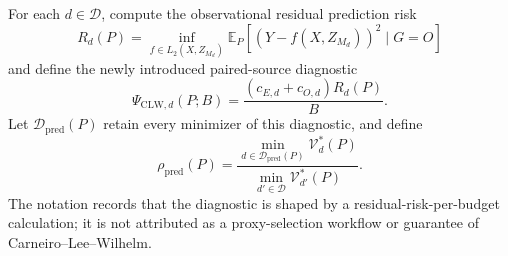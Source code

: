 For each \(d\in\mathcal D\), compute the observational residual prediction risk
\[
R_d(P)=\inf_{f\in L_2(X,Z_{M_d})}\mathbb E_P[(Y-f(X,Z_{M_d}))^2\mid G=O]
\]
and define the newly introduced paired-source diagnostic
\[
\Psi_{\mathrm{CLW},d}(P;B)=\frac{(c_{E,d}+c_{O,d})R_d(P)}{B}.
\]
Let \(\mathcal D_{\mathrm{pred}}(P)\) retain every minimizer of this diagnostic, and define
\[
\rho_{\mathrm{pred}}(P)=
\frac{\min_{d\in\mathcal D_{\mathrm{pred}}(P)}\mathcal V_d^*(P)}
{\min_{d'\in\mathcal D}\mathcal V_{d'}^*(P)}.
\]
The notation records that the diagnostic is shaped by a residual-risk-per-budget calculation; it is not attributed as a proxy-selection workflow or guarantee of Carneiro--Lee--Wilhelm.